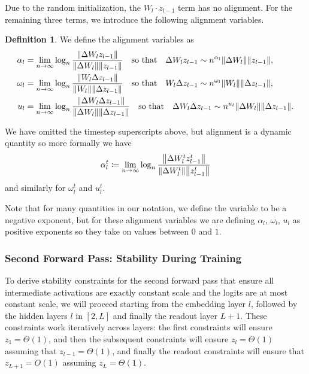 \documentclass{article}
\theoremstyle{plain}
\theoremstyle{definition}
\newtheorem{appendixdef}{Definition}[section]
\theoremstyle{remark}
\begin{document}
Due to the random initialization, the $W_l \cdot z_{l-1}$ term has no alignment. For the remaining three terms, we introduce the following alignment variables.
\begingroup
\begin{appendixdef} We define the alignment variables as
\begin{align*}
\alpha_l &=  \lim_{n \rightarrow \infty} \log_n \frac{\norm{ \Delta W_l z_{l-1}}}{\norm{\Delta W_l} \norm{z_{l-1}}}\quad\textrm{so that}\quad\Delta W_l z_{l-1} \sim n^{\alpha_l} \norm{\Delta W_l}\norm{z_{l-1}},\\
\omega_l &=  \lim_{n \rightarrow \infty} \log_n \frac{\norm{W_l \Delta z_{l-1}}}{\norm{W_l}\norm{\Delta z_{l-1}}}\quad\textrm{so that}\quad W_l\Delta z_{l-1} \sim n^{\omega_l} \norm{ W_l}\norm{\Delta z_{l-1}},\\
u_l &= \lim_{n \rightarrow \infty} \log_n \frac{\norm{\Delta W_l \Delta z_{l-1}}}{\norm{\Delta W_l}\norm{\Delta z_{l-1}}}\quad\textrm{so that}\quad \Delta W_l \Delta z_{l-1} \sim n^{u_l} \norm{\Delta W_l}\norm{\Delta z_{l-1}}.\\
\end{align*}
\end{appendixdef}
\endgroup
We have omitted the timestep superscripts above, but alignment is a dynamic quantity so more formally we have 
\begin{align*}
\alpha_l^t \coloneqq  \lim_{n \rightarrow \infty} \log_n \frac{\norm{ \Delta W_l^t z_{l-1}^t}}{\norm{\Delta W_l^t} \norm{z_{l-1}^t}}
\end{align*}
and similarly for $\omega_l^t$ and $u_l^t$.

Note that for many quantities in our notation, we define the variable to be a negative exponent, but for these alignment variables we are defining $\alpha_l$, $\omega_l$, $u_l$ as positive exponents so they take on values between $0$ and $1$.




\subsubsection{Second Forward Pass: Stability During Training}
\label{app:theory_second_forward}
To derive stability constraints for the second forward pass that ensure all intermediate activations are exactly constant scale and the logits are at most constant scale, we will proceed starting from the embedding layer $l$, followed by the hidden layers $l$ in $[2,L]$ and finally the readout layer $L+1$. These constraints work iteratively across layers: the first constraints will ensure $z_1 = \Theta(1)$, and then the subsequent constraints will ensure $z_{l} = \Theta(1)$ assuming that $z_{l-1} = \Theta(1)$, and finally the readout constraints will ensure that $z_{L+1} = O(1)$ assuming $z_{L} = \Theta(1)$.
\end{document}
